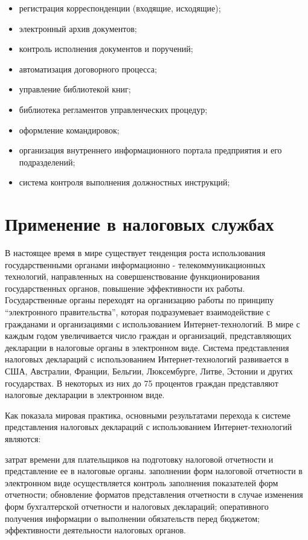 \documentclass[14pt,a4paper]{reportmod}
\begin{document}
\begin{itemize}
  \item регистрация корреспонденции (входящие, исходящие);
  \item электронный архив документов;
  \item контроль исполнения документов и поручений;
  \item автоматизация договорного процесса;
  \item управление библиотекой книг;
  \item библиотека регламентов управленческих процедур;
  \item оформление командировок;
  \item организация внутреннего информационного портала предприятия и его подразделений;
  \item система контроля выполнения должностных инструкций;
\end{itemize}

\section{Применение в налоговых службах}
В настоящее время в мире существует тенденция роста использования государственными органами информационно - телекоммуникационных технологий, направленных на совершенствование функционирования государственных органов, повышение эффективности их работы. Государственные органы переходят на организацию работы по принципу ``электронного правительства'', которая подразумевает взаимодействие с гражданами и организациями с использованием Интернет-технологий. В мире с каждым годом увеличивается число граждан и организаций, представляющих декларации в налоговые органы в электронном виде. Система представления налоговых деклараций с использованием Интернет-технологий развивается в США, Австралии, Франции, Бельгии, Люксембурге, Литве, Эстонии и других государствах. В некоторых из них до 75 процентов граждан представляют налоговые декларации в электронном виде.

Как показала мировая практика, основными результатами перехода к системе представления налоговых деклараций с использованием Интернет-технологий являются:
\begin{itemize}
   затрат времени для плательщиков на подготовку налоговой отчетности и представление ее в налоговые органы. заполнении форм налоговой отчетности в электронном виде осуществляется контроль заполнения показателей форм отчетности;
   обновление форматов представления отчетности в случае изменения форм бухгалтерской отчетности и налоговых деклараций;
   оперативного получения информации о выполнении обязательств перед бюджетом;
   эффективности деятельности налоговых органов.
\end{itemize}
\end{document}
